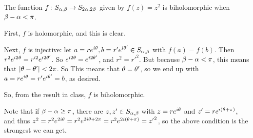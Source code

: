 \documentclass[a4paper,12pt]{article}
\begin{document}
The function $f: S_{\alpha,\beta} \to S_{2\alpha,2\beta}$ given by $f(z) = z^2$ is biholomorphic when $\beta-\alpha < \pi$.

First, $f$ is holomorphic, and this is clear.

Next, $f$ is injective: let $a=re^{i\theta}, b=r'e^{i\theta'} \in S_{\alpha,\beta}$ with $f(a)=f(b)$. Then $r^2e^{i2\theta}=r'^2e^{i2\theta'}$. So $e^{i2\theta} = e^{i2\theta'}$, and $r^2 = r'^2$. But because $\beta-\alpha < \pi$, this means that $\left\lvert \theta-\theta' \right\rvert < 2\pi$. So This means that $\theta = \theta'$, so we end up with $a=re^{i\theta}=r'e^{i\theta'}=b$, as desired.

So, from the result in class, $f$ is biholomorphic.

Note that if $\beta-\alpha \geq \pi$, there are $z,z' \in S_{\alpha,\beta}$ with $z=re^{i\theta}$ and $z' = re^{i(\theta + \pi)}$, and thus $z^2 = r^2e^{2i\theta} = r^2e^{2i\theta + 2\pi} = r^2e^{2i(\theta + \pi)} = {z'}^2$, so the above condition is the strongest we can get.

\shunt
\end{document}
